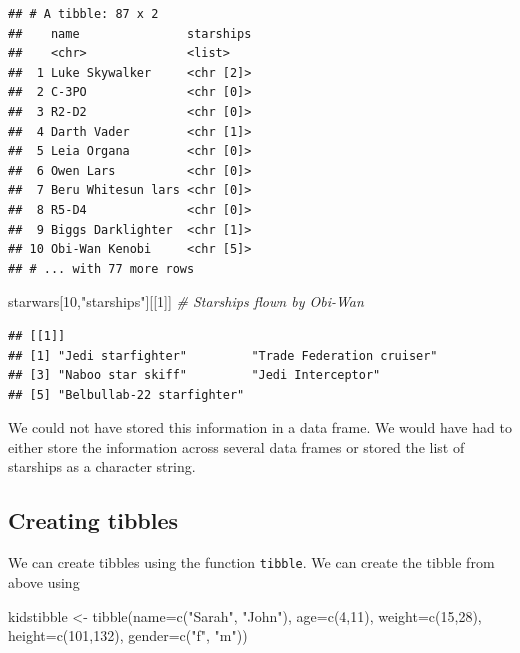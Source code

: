 \documentclass[
]{book}
\newenvironment{Shaded}{\begin{snugshade}}{\end{snugshade}}
\newcommand{\AttributeTok}[1]{\textcolor[rgb]{0.77,0.63,0.00}{#1}}
\newcommand{\CommentTok}[1]{\textcolor[rgb]{0.56,0.35,0.01}{\textit{#1}}}
\newcommand{\DecValTok}[1]{\textcolor[rgb]{0.00,0.00,0.81}{#1}}
\newcommand{\FunctionTok}[1]{\textcolor[rgb]{0.00,0.00,0.00}{#1}}
\newcommand{\NormalTok}[1]{#1}
\newcommand{\OtherTok}[1]{\textcolor[rgb]{0.56,0.35,0.01}{#1}}
\newcommand{\StringTok}[1]{\textcolor[rgb]{0.31,0.60,0.02}{#1}}
\begin{document}
\begin{verbatim}
## # A tibble: 87 x 2
##    name               starships
##    <chr>              <list>   
##  1 Luke Skywalker     <chr [2]>
##  2 C-3PO              <chr [0]>
##  3 R2-D2              <chr [0]>
##  4 Darth Vader        <chr [1]>
##  5 Leia Organa        <chr [0]>
##  6 Owen Lars          <chr [0]>
##  7 Beru Whitesun lars <chr [0]>
##  8 R5-D4              <chr [0]>
##  9 Biggs Darklighter  <chr [1]>
## 10 Obi-Wan Kenobi     <chr [5]>
## # ... with 77 more rows
\end{verbatim}

\begin{Shaded}
\begin{Highlighting}[]
\NormalTok{starwars[}\DecValTok{10}\NormalTok{,}\StringTok{"starships"}\NormalTok{][[}\DecValTok{1}\NormalTok{]]              }\CommentTok{\# Starships flown by Obi{-}Wan}
\end{Highlighting}
\end{Shaded}

\begin{verbatim}
## [[1]]
## [1] "Jedi starfighter"         "Trade Federation cruiser"
## [3] "Naboo star skiff"         "Jedi Interceptor"        
## [5] "Belbullab-22 starfighter"
\end{verbatim}

We could not have stored this information in a data frame. We would have had to either store the information across several data frames or stored the list of starships as a character string.

\hypertarget{creating-tibbles}{%
\subsection{Creating tibbles}\label{creating-tibbles}}

We can create tibbles using the function \texttt{tibble}. We can create the tibble from above using

\begin{Shaded}
\begin{Highlighting}[]
\NormalTok{kidstibble }\OtherTok{\textless{}{-}} \FunctionTok{tibble}\NormalTok{(}\AttributeTok{name=}\FunctionTok{c}\NormalTok{(}\StringTok{"Sarah"}\NormalTok{, }\StringTok{"John"}\NormalTok{), }\AttributeTok{age=}\FunctionTok{c}\NormalTok{(}\DecValTok{4}\NormalTok{,}\DecValTok{11}\NormalTok{), }\AttributeTok{weight=}\FunctionTok{c}\NormalTok{(}\DecValTok{15}\NormalTok{,}\DecValTok{28}\NormalTok{),}
                     \AttributeTok{height=}\FunctionTok{c}\NormalTok{(}\DecValTok{101}\NormalTok{,}\DecValTok{132}\NormalTok{), }\AttributeTok{gender=}\FunctionTok{c}\NormalTok{(}\StringTok{"f"}\NormalTok{, }\StringTok{"m"}\NormalTok{))}
\end{Highlighting}
\end{Shaded}
\end{document}
